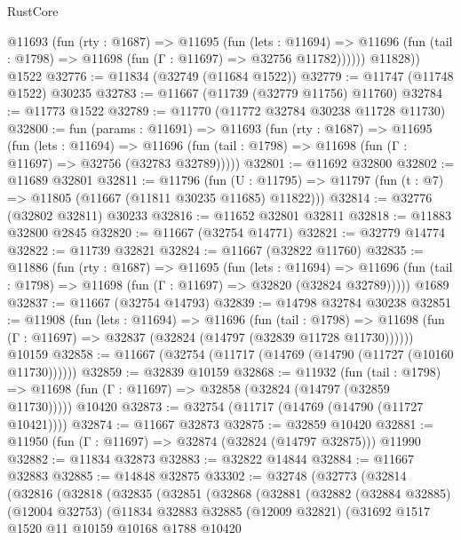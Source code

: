 \begin{lexlean}{RustCore}
\begin{coremodule}
          @11693
            (fun (rty : @1687) =>
            @11695
              (fun (lets : @11694) =>
              @11696 (fun (tail : @1798) => @11698 (fun (Γ : @11697) => @32756 @11782))))))
        @11828))
    @1522
@32776 := @11834 (@32749 (@11684 @1522))
@32779 := @11747 (@11748 @1522) @30235
@32783 := @11667 (@11739 (@32779 @11756) @11760)
@32784 := @11773 @1522
@32789 := @11770 (@11772 @32784 @30238 @11728 @11730)
@32800 := fun (params : @11691) =>
  @11693
    (fun (rty : @1687) =>
    @11695
      (fun (lets : @11694) =>
      @11696 (fun (tail : @1798) => @11698 (fun (Γ : @11697) => @32756 (@32783 @32789)))))
@32801 := @11692 @32800
@32802 := @11689 @32801
@32811 := @11796
    (fun (U : @11795) => @11797 (fun (t : @7) => @11805 (@11667 (@11811 @30235 @11685) @11822)))
@32814 := @32776 (@32802 @32811) @30233
@32816 := @11652 @32801 @32811
@32818 := @11883 @32800 @2845
@32820 := @11667 (@32754 @14771)
@32821 := @32779 @14774
@32822 := @11739 @32821
@32824 := @11667 (@32822 @11760)
@32835 := @11886
    (fun (rty : @1687) =>
    @11695
      (fun (lets : @11694) =>
      @11696 (fun (tail : @1798) => @11698 (fun (Γ : @11697) => @32820 (@32824 @32789)))))
    @1689
@32837 := @11667 (@32754 @14793)
@32839 := @14798 @32784 @30238
@32851 := @11908
    (fun (lets : @11694) =>
    @11696
      (fun (tail : @1798) =>
      @11698 (fun (Γ : @11697) => @32837 (@32824 (@14797 (@32839 @11728 @11730))))))
    @10159
@32858 := @11667 (@32754 (@11717 (@14769 (@14790 (@11727 (@10160 @11730))))))
@32859 := @32839 @10159
@32868 := @11932
    (fun (tail : @1798) => @11698 (fun (Γ : @11697) => @32858 (@32824 (@14797 (@32859 @11730)))))
    @10420
@32873 := @32754 (@11717 (@14769 (@14790 (@11727 @10421))))
@32874 := @11667 @32873
@32875 := @32859 @10420
@32881 := @11950 (fun (Γ : @11697) => @32874 (@32824 (@14797 @32875))) @11990
@32882 := @11834 @32873
@32883 := @32822 @14844
@32884 := @11667 @32883
@32885 := @14848 @32875
@33302 := @32748
    (@32773
      (@32814
        (@32816
          (@32818
            (@32835
              (@32851
                (@32868
                  (@32881
                    (@32882
                      (@32884 @32885)
                      (@12004 @32753)
                      (@11834
                        @32883
                        @32885
                        (@12009 @32821)
                        (@31692
                          @1517
                          @1520
                          @11
                          @10159
                          @10168
                          @1788
                          @10420

\end{coremodule}
\end{lexlean}

